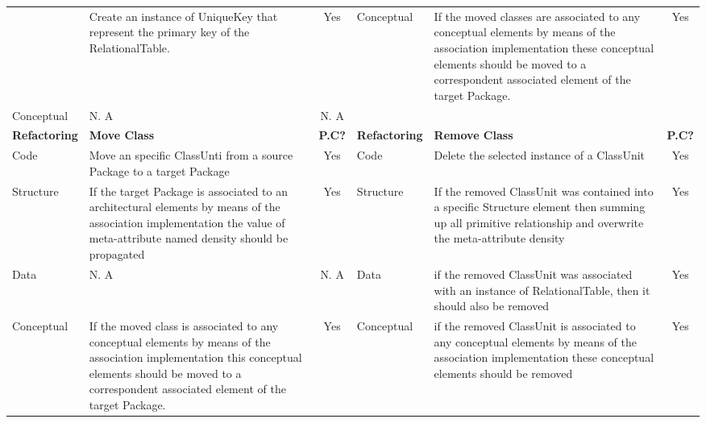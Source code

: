 \begin{table*}
{\begin{tabular}{|l|>{\raggedright}p{7cm}|c|l|>{\raggedright}p{7cm}|c|}
\cline{2-6} 
 & {\footnotesize{Create an instance of UniqueKey that represent the
primary key of the RelationalTable.}} & {\footnotesize{Yes}} & \multirow{2}{*}{{\footnotesize{Conceptual}}} & {\footnotesize{If the moved classes are associated to any conceptual
elements by means of the association implementation these conceptual
elements should be moved to a correspondent associated element of
the target Package.}} & \multirow{2}{*}{{\footnotesize{Yes}}}\tabularnewline
\cline{1-3} 
{\footnotesize{Conceptual}} & {\footnotesize{N. A}} & {\footnotesize{N. A}} &  &  & \tabularnewline
\hline 
\textbf{{\footnotesize{\cellcolor{gray!40}Refactoring}}} & {\textbf{\footnotesize{\cellcolor{gray!40}Move Class}}} & {\textbf{\footnotesize{\cellcolor{gray!40}P.C?}}} & {\textbf{\footnotesize{\cellcolor{gray!40}Refactoring}}} & {\textbf{\footnotesize{\cellcolor{gray!40}Remove Class}}} & {\textbf{\footnotesize{\cellcolor{gray!40}P.C?}}}\tabularnewline
\hline 
{\footnotesize{Code}} & {\footnotesize{Move an specific ClassUnti from a source Package to
a target Package}} & {\footnotesize{Yes}} & {\footnotesize{Code}} & {\footnotesize{Delete the selected instance of a ClassUnit}} & {\footnotesize{Yes}}\tabularnewline
\hline 
{\footnotesize{Structure}} & {\footnotesize{If the target Package is associated to an architectural
elements by means of the association implementation the value of meta-attribute
named density should be propagated}} & {\footnotesize{Yes}} & {\footnotesize{Structure}} & {\footnotesize{If the removed ClassUnit was contained into a specific
Structure element then summing up all primitive relationship and overwrite
the meta-attribute density}} & {\footnotesize{Yes}}\tabularnewline
\hline 
{\footnotesize{Data}} & {\footnotesize{N. A}} & {\footnotesize{N. A}} & {\footnotesize{Data}} & {\footnotesize{if the removed ClassUnit was associated with an instance
of RelationalTable, then it should also be removed}} & {\footnotesize{Yes}}\tabularnewline
\hline 
{\footnotesize{Conceptual}} & {\footnotesize{If the moved class is associated to any conceptual
elements by means of the association implementation this conceptual
elements should be moved to a correspondent associated element of
the target Package.}} & {\footnotesize{Yes}} & {\footnotesize{Conceptual}} & {\footnotesize{if the removed ClassUnit is associated to any conceptual
elements by means of the association implementation these conceptual
elements should be removed}} & {\footnotesize{Yes}}\tabularnewline
\hline 
\end{tabular}}
\end{table*}


